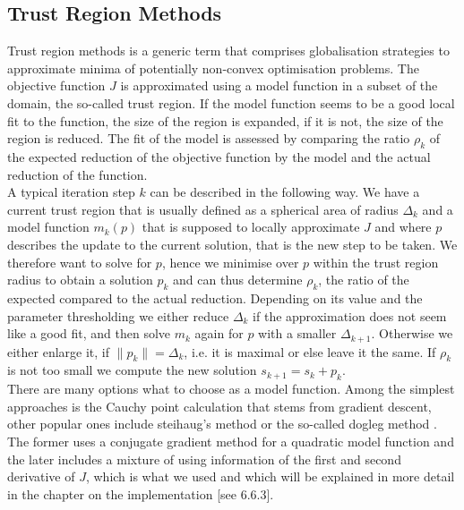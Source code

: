 \documentclass[../draft_1.tex]{subfiles}
\begin{document}
\subsection{Trust Region Methods}

Trust region methods is a generic term that comprises globalisation strategies to approximate minima of potentially non-convex optimisation problems. The objective function $J$ is approximated using a model function in a subset of the domain, the so-called trust region. If the model function seems to be a good local fit to the function, the size of the region is expanded, if it is not, the size of the region is reduced. The fit of the model is assessed by comparing the ratio $\rho_k$ of the expected reduction of the objective function by the model and the actual reduction of the function. 
\smallskip
\\
A typical iteration step $k$ can be described in the following way. We have a current trust region that is usually defined as a spherical area of radius $\Delta_k$ and a model function $m_k(p)$ that is supposed to locally approximate $J$ and where $p$ describes the update to the current solution, that is the new step to be taken. We therefore want to solve for $p$, hence we minimise over $p$ within the trust region radius to obtain a solution $p_k$ and can thus determine $\rho_k$, the ratio of the expected compared to the actual reduction. Depending on its value and the parameter thresholding we either reduce $\Delta_k$ if the approximation does not seem like a good fit, and then solve $m_k$ again for $p$ with a smaller $\Delta_{k+1}$. Otherwise we either enlarge it, if $\| p_k \| = \Delta_k$, i.e. it is maximal or else leave it the same. If $\rho_k$ is not too small we compute the new solution $s_{k+1} = s_k + p_k$. 
\smallskip
\\
There are many options what to choose as a model function. Among the simplest approaches is the Cauchy point calculation that stems from gradient descent, other popular ones include steihaug's method or the so-called dogleg method \cite{NoceWrig99}. The former uses a conjugate gradient method for a quadratic model function and the later includes a mixture of using information of the first and second derivative of $J$, which is what we used and which will be explained in more detail in the chapter on the implementation [see 6.6.3].
 
\end{document}
